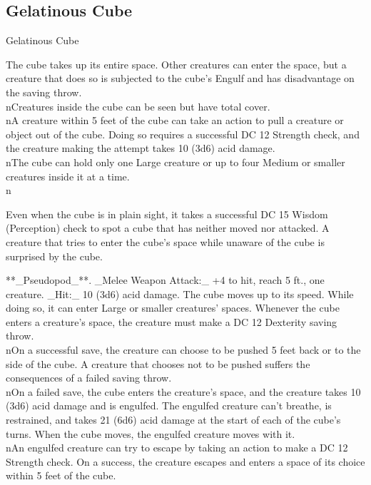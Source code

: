 \subsection{Gelatinous Cube}
\begin{DndMonster}[float=*b,width\textwidth + 8pt]{Gelatinous Cube}
\begin{multicols}{2}
\DndMonsterBasics[armor-class={6}, hit-points={84 (8d10 + 40)}, speed={15 ft.}]
\DndMonsterDetails[saving-throws={}, skills={}, damage-immunities={}, damage-resistances={}, damage-vulnerabilities={}, condition-immunities={blinded, charmed, deafened, exhaustion, frightened, prone}, senses={blindsight 60 ft. (blind beyond this radius), passive Perception 8}, languages={—}, challenge={2 (450 XP)}]
 The cube takes up its entire space. Other creatures can enter the space, but a creature that does so is subjected to the cube’s Engulf and has disadvantage on the saving throw.\\nCreatures inside the cube can be seen but have total cover.\\nA creature within 5 feet of the cube can take an action to pull a creature or object out of the cube. Doing so requires a successful DC 12 Strength check, and the creature making the attempt takes 10 (3d6) acid damage.\\nThe cube can hold only one Large creature or up to four Medium or smaller creatures inside it at a time.\\n

 Even when the cube is in plain sight, it takes a successful DC 15 Wisdom (Perception) check to spot a cube that has neither moved nor attacked. A creature that tries to enter the cube’s space while unaware of the cube is surprised by the cube.

**_Pseudopod_**. _Melee Weapon Attack:_ +4 to hit, reach 5 ft., one creature. _Hit:_ 10 (3d6) acid damage.
The cube moves up to its speed. While doing so, it can enter Large or smaller creatures’ spaces. Whenever the cube enters a creature’s space, the creature must make a DC 12 Dexterity saving throw.\\nOn a successful save, the creature can choose to be pushed 5 feet back or to the side of the cube. A creature that chooses not to be pushed suffers the consequences of a failed saving throw.\\nOn a failed save, the cube enters the creature’s space, and the creature takes 10 (3d6) acid damage and is engulfed. The engulfed creature can’t breathe, is restrained, and takes 21 (6d6) acid damage at the start of each of the cube’s turns. When the cube moves, the engulfed creature moves with it.\\nAn engulfed creature can try to escape by taking an action to make a DC 12 Strength check. On a success, the creature escapes and enters a space of its choice within 5 feet of the cube.
\end{multicols}
\end{DndMonster}
